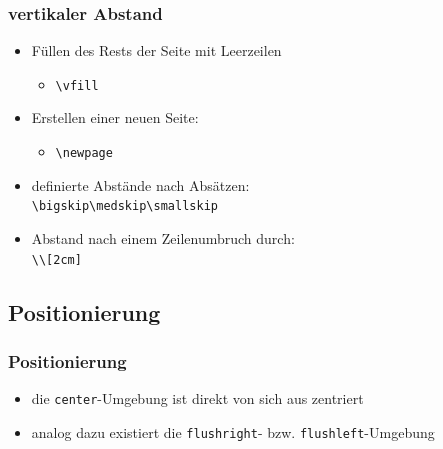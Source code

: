 \begin{frame}[fragile]
\frametitle{vertikaler Abstand}
\begin{itemize}[<+->]
  \item Füllen des Rests der Seite mit Leerzeilen
  \begin{itemize}
      \item \lstinline[style=Latex]+\vfill+%
    \end{itemize}\vfill
  \item Erstellen einer neuen Seite:
    \begin{itemize}
      \item \lstinline[style=Latex]+\newpage+%
    \end{itemize}\vfill
  \item definierte Abstände nach Absätzen: \\
    \lstinline[style=Latex]+\bigskip+\hfill \lstinline[style=Latex]+\medskip+\hfill \lstinline[style=Latex]+\smallskip+ \hfill\,
\vfill
  \item Abstand nach einem Zeilenumbruch durch:\\
    \lstinline[style=Latex]+\\[2cm]+
\end{itemize}
\end{frame}

\subsection{Positionierung}

\begin{frame}[fragile]
\frametitle{Positionierung}
\begin{itemize}[<+->]
\item die \texttt{center}-Umgebung ist direkt von sich aus zentriert
\item analog dazu existiert die \texttt{flushright}- bzw. \texttt{flushleft}-Umgebung
\end{itemize}
\end{frame}

